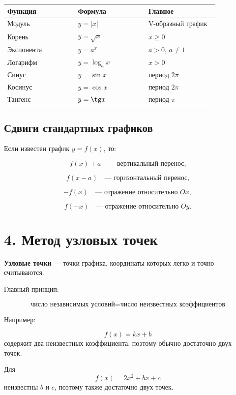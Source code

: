\documentclass[a4paper,12pt]{article}
\newcommand{\key}[1]{\textcolor{darkaccent}{\textbf{#1}}}
\begin{document}
\begin{center}
\small
\renewcommand{\arraystretch}{1.25}
\begin{tabular}{@{}p{0.31\linewidth}p{0.31\linewidth}p{0.31\linewidth}@{}}
\toprule
\textbf{Функция} & \textbf{Формула} & \textbf{Главное} \\
\midrule
Модуль & $y=|x|$ & V-образный график \\
Корень & $y=\sqrt{x}$ & $x\ge0$ \\
Экспонента & $y=a^x$ & $a>0$, $a\ne1$ \\
Логарифм & $y=\log_a x$ & $x>0$ \\
Синус & $y=\sin x$ & период $2\pi$ \\
Косинус & $y=\cos x$ & период $2\pi$ \\
Тангенс & $y=\tg x$ & период $\pi$ \\
\bottomrule
\end{tabular}
\end{center}

\subsection*{Сдвиги стандартных графиков}

Если известен график $y=f(x)$, то:

\[
f(x)+a
\quad\text{--- вертикальный перенос,}
\]

\[
f(x-a)
\quad\text{--- горизонтальный перенос,}
\]

\[
-f(x)
\quad\text{--- отражение относительно }Ox,
\]

\[
f(-x)
\quad\text{--- отражение относительно }Oy.
\]

\clearpage

\section*{\textcolor{darkaccent}{4. Метод узловых точек}}

\key{Узловые точки} --- точки графика, координаты которых легко и точно считываются.

Главный принцип:

\[
\boxed{
\text{число независимых условий}
=
\text{число неизвестных коэффициентов}
}
\]

Например:

\[
f(x)=kx+b
\]
содержит два неизвестных коэффициента, поэтому обычно достаточно двух точек.

Для
\[
f(x)=2x^2+bx+c
\]
неизвестны $b$ и $c$, поэтому также достаточно двух точек.
\end{document}
